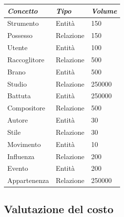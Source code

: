 \documentclass{article}
\begin{document}
    \begin{center}
        \begin{tabular}{lll}
            \toprule
            \textbf{\textit{Concetto}} & \textbf{\textit{Tipo}} & \textbf{\textit{Volume}}\\
            \midrule
            Strumento & Entità & 150\\
            \midrule
            Possesso & Relazione & 150\\
            \midrule
            Utente & Entità & 100\\
            \midrule
            Raccoglitore & Relazione & 500\\
            \midrule
            Brano &  Entità & 500\\
            \midrule
            Studio & Relazione & 250000\\
            \midrule
            Battuta &  Entità & 250000\\
            \midrule
            Compositore & Relazione & 500\\
            \midrule
            Autore &  Entità & 30\\
            \midrule
            Stile & Relazione & 30\\
            \midrule
            Movimento &  Entità & 10\\
            \midrule
            Influenza & Relazione & 200\\
            \midrule
            Evento &  Entità & 200\\
            \midrule
            Appartenenza & Relazione & 250000\\
            \bottomrule
        \end{tabular}
    \end{center}

    \subsection{Valutazione del costo}
\end{document}
